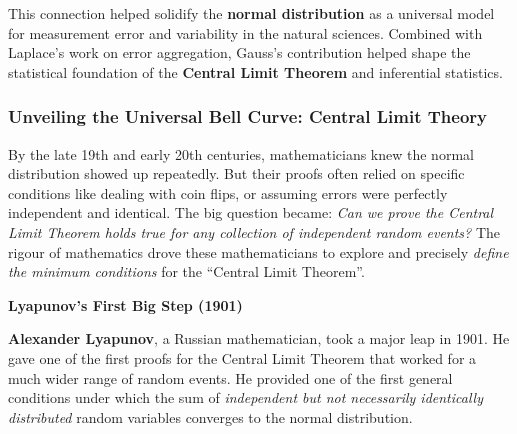 This connection helped solidify the \textbf{normal distribution} as a universal model for measurement error and variability in the natural sciences. Combined with Laplace’s work on error aggregation, Gauss’s contribution helped shape the statistical foundation of the \textbf{Central Limit Theorem} and inferential statistics.

\subsubsection{Unveiling the Universal Bell Curve: Central Limit Theory}
By the late 19th and early 20th centuries, mathematicians knew the normal distribution showed up repeatedly. But their proofs often relied on specific conditions like dealing with coin flips, or assuming errors were perfectly independent and identical. The big question became: \textit{Can we prove the Central Limit Theorem holds true for any collection of independent random events?} The rigour of mathematics drove these mathematicians to explore and precisely \emph{define the minimum conditions} for the ``Central Limit Theorem''.
\smallskip

\vspace{0.5em}
\noindent \textbf{Lyapunov's First Big Step (1901)}
\vspace{0.5em}

\textbf{Alexander Lyapunov}, a Russian mathematician, took a major leap in 1901. He gave one of the first proofs for the Central Limit Theorem that worked for a much wider range of random events. He provided one of the first general conditions under which the sum of \emph{independent but not necessarily identically distributed} random variables converges to the normal distribution.

